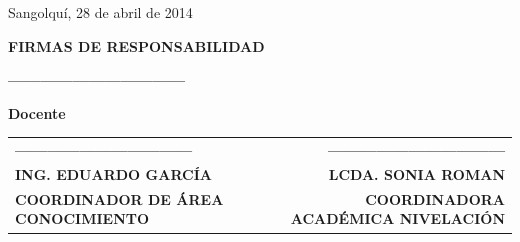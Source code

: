 \documentclass[10pt,a4paper]{article}
\begin{document}
\begin{flushright}
Sangolquí, 28 de abril de 2014\\
\end{flushright}
\vspace{2cm}
\begin{center}
{\bf FIRMAS DE RESPONSABILIDAD}
\end{center}
\vspace{0.05cm}
\begin{center}
\textbf{---------------------------------}
\end{center}
\begin{center}
{\bf Docente}
\end{center}
\begin{center}
\noindent
\begin{tabularx}{\textwidth}{l X r}
\textbf{---------------------------------}&&\textbf{---------------------------------}\\
{\bf ING. EDUARDO GARCÍA}&&{\bf LCDA. SONIA ROMAN}\\
{\bf {\small COORDINADOR DE ÁREA CONOCIMIENTO}} && {\bf {\small COORDINADORA ACADÉMICA NIVELACIÓN}}
\end{tabularx}
\end{center}
\end{document}
